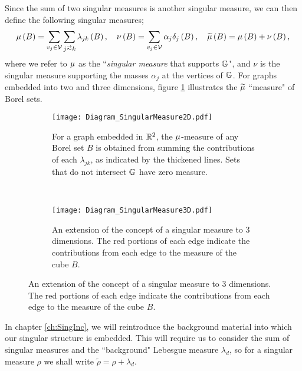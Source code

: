 Since the sum of two singular measures is another singular measure, we can then define the following singular measures;
\begin{align*}
	\ddmes\bracs{B} = \sum_{v_j\in \vertSet}\sum_{j\conLeft k} \lambda_{jk}\bracs{B},
	\quad
	\nu\bracs{B} = \sum_{v_j\in\vertSet}\alpha_j\delta_j\bracs{B},
	\quad
	\dddmes\bracs{B} = \ddmes\bracs{B} + \nu\bracs{B},
\end{align*}
where we refer to $\mu$ as the ``\emph{singular measure} that supports $\mathbb{G}$", and $\nu$ is the singular measure supporting the masses $\alpha_j$ at the vertices of $\mathbb{G}$.
For graphs embedded into two and three dimensions, figure \ref{fig:Diagram_SingularMeasure2D} illustrates the $\widetilde{\mu}$ ``measure" of Borel sets.
\begin{figure}[b!]
	\centering
	\begin{subfigure}[t]{0.45\textwidth}
		\centering
		\texttt{[image: Diagram\_SingularMeasure2D.pdf]}
		\caption{\label{fig:Diagram_SingularMeasure2D} For a graph embedded in $\mathbb{R}^2$, the $\mu$-measure of any Borel set $B$ is obtained from summing the contributions of each $\lambda_{jk}$, as indicated by the thickened lines. Sets that do not intersect $\mathbb{G}$ have zero measure.}
	\end{subfigure}
	~
	\begin{subfigure}[t]{0.45\textwidth}
		\centering
		\texttt{[image: Diagram\_SingularMeasure3D.pdf]}
		\caption{\label{fig:Diagram_SingularMeasure3D} An extension of the concept of a singular measure to 3 dimensions. The red portions of each edge indicate the contributions from each edge to the measure of the cube $B$.}
	\end{subfigure}
\end{figure}
In chapter \ref{ch:SingInc}, we will reintroduce the background material into which our singular structure is embedded.
This will require us to consider the sum of singular measures and the ``background" Lebesgue measure $\lambda_d$, so for a singular measure $\rho$ we shall write  $\tilde{\rho} = \rho + \lambda_d$.